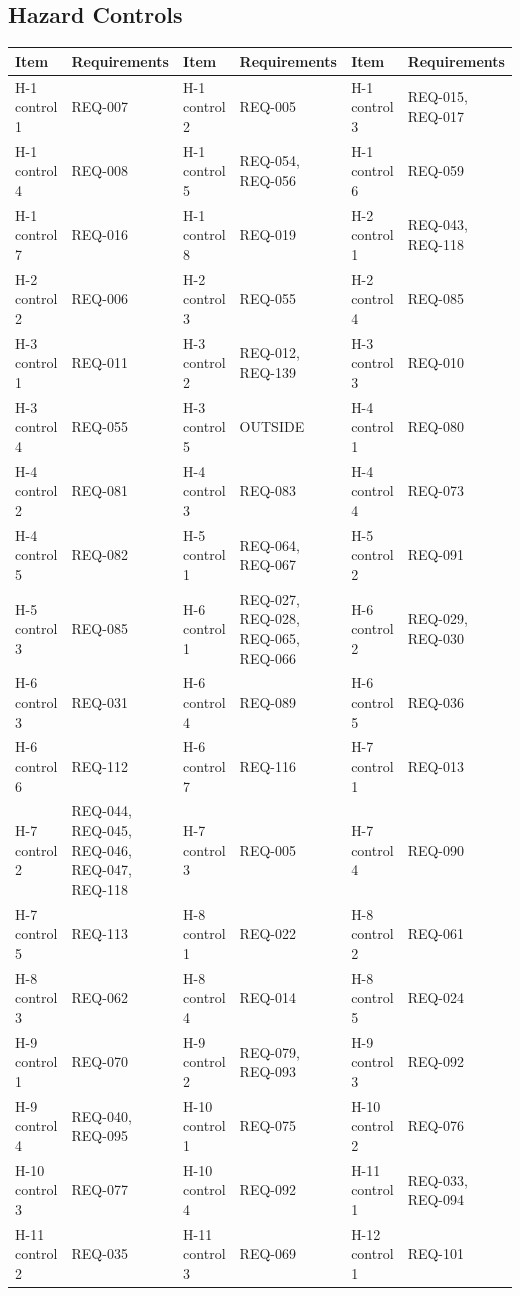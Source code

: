 \documentclass[11pt,a4paper]{article}
\begin{document}
\subsection{Hazard Controls}
{\footnotesize
\begin{longtable}{@{}>{\raggedright\arraybackslash}p{2.1cm}>{\raggedright\arraybackslash}p{2.5cm}>{\raggedright\arraybackslash}p{2.1cm}>{\raggedright\arraybackslash}p{2.5cm}>{\raggedright\arraybackslash}p{2.1cm}>{\raggedright\arraybackslash}p{2.5cm}@{}}
\toprule
Item & Requirements & Item & Requirements & Item & Requirements \\
\midrule
\endhead
H-1 control 1 & REQ-007 & H-1 control 2 & REQ-005 & H-1 control 3 & REQ-015, REQ-017 \\
H-1 control 4 & REQ-008 & H-1 control 5 & REQ-054, REQ-056 & H-1 control 6 & REQ-059 \\
H-1 control 7 & REQ-016 & H-1 control 8 & REQ-019 & H-2 control 1 & REQ-043, REQ-118 \\
H-2 control 2 & REQ-006 & H-2 control 3 & REQ-055 & H-2 control 4 & REQ-085 \\
H-3 control 1 & REQ-011 & H-3 control 2 & REQ-012, REQ-139 & H-3 control 3 & REQ-010 \\
H-3 control 4 & REQ-055 & H-3 control 5 & OUTSIDE & H-4 control 1 & REQ-080 \\
H-4 control 2 & REQ-081 & H-4 control 3 & REQ-083 & H-4 control 4 & REQ-073 \\
H-4 control 5 & REQ-082 & H-5 control 1 & REQ-064, REQ-067 & H-5 control 2 & REQ-091 \\
H-5 control 3 & REQ-085 & H-6 control 1 & REQ-027, REQ-028, REQ-065, REQ-066 & H-6 control 2 & REQ-029, REQ-030 \\
H-6 control 3 & REQ-031 & H-6 control 4 & REQ-089 & H-6 control 5 & REQ-036 \\
H-6 control 6 & REQ-112 & H-6 control 7 & REQ-116 & H-7 control 1 & REQ-013 \\
H-7 control 2 & REQ-044, REQ-045, REQ-046, REQ-047, REQ-118 & H-7 control 3 & REQ-005 & H-7 control 4 & REQ-090 \\
H-7 control 5 & REQ-113 & H-8 control 1 & REQ-022 & H-8 control 2 & REQ-061 \\
H-8 control 3 & REQ-062 & H-8 control 4 & REQ-014 & H-8 control 5 & REQ-024 \\
H-9 control 1 & REQ-070 & H-9 control 2 & REQ-079, REQ-093 & H-9 control 3 & REQ-092 \\
H-9 control 4 & REQ-040, REQ-095 & H-10 control 1 & REQ-075 & H-10 control 2 & REQ-076 \\
H-10 control 3 & REQ-077 & H-10 control 4 & REQ-092 & H-11 control 1 & REQ-033, REQ-094 \\
H-11 control 2 & REQ-035 & H-11 control 3 & REQ-069 & H-12 control 1 & REQ-101 \\
\bottomrule
\end{longtable}}
\end{document}
